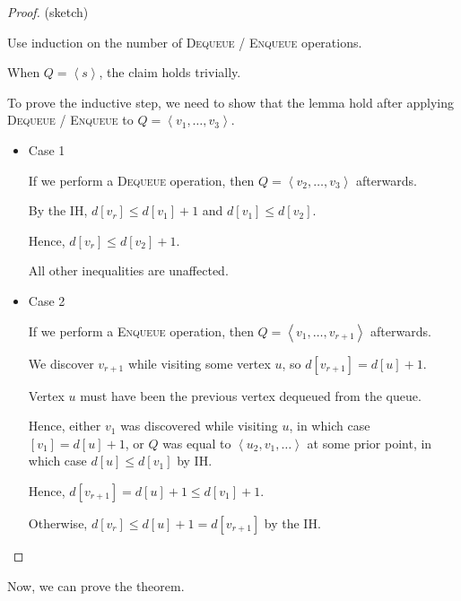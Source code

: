 
\begin{proof}
    (sketch)

    Use induction on the number of \textsc{Dequeue} / \textsc{Enqueue} operations.

    When $Q = \left< s \right>$, the claim holds trivially.

    To prove the inductive step, we need to show that the lemma hold after applying \textsc{Dequeue} / \textsc{Enqueue} to $Q = \left< v_1, \dots, v_3 \right>$.

    \begin{itemize}
        \item Case 1
        
        If we perform a \textsc{Dequeue} operation, then $Q = \left< v_2, \dots, v_3 \right>$ afterwards.

        By the IH, $d[v_r] \leq d[v_1] + 1$ and $d[v_1] \le d[v_2]$.

        Hence, $d[v_r] \leq d[v_2] + 1$.

        All other inequalities are unaffected. 

        \item Case 2 
        
        If we perform a \textsc{Enqueue} operation, then $Q = \left< v_1, \dots, v_{r+1} \right>$ afterwards.

        We discover $v_{r+1}$ while visiting some vertex $u$, so $d[v_{r+1}] = d[u] + 1$.

        Vertex $u$ must have been the previous vertex dequeued from the queue. 

        Hence, either $v_1$ was discovered while visiting $u$, in which case $[v_1] = d[u] + 1$, or $Q$ was equal to $\left< u_2, v_1, \dots \right>$ at some prior point, in which case $d[u] \leq d[v_1]$ by IH.

        Hence, $d[v_{r+1}] = d[u] + 1 \leq d[v_1] + 1$.

        Otherwise, $d[v_r] \leq d[u] + 1 = d[v_{r+1}]$ by the IH. 
    \end{itemize}
\end{proof}

Now, we can prove the theorem.

